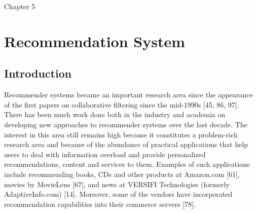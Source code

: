 Chapter 5

\chapter{Recommendation System} %

\label{Chapter5} %



\section{Introduction}
Recommender systems became an important research area since the appearance of the first papers on collaborative filtering since the mid-1990s [45, 86, 97]. There has been much work done both in the industry and academia on developing new approaches to recommender systems over the last decade. The interest in this area still remains high because it constitutes a problem-rich research area and because of the abundance of practical applications that help users to deal with information overload and provide personalized recommendations, content and services to them. Examples of such applications include recommending books, CDs and other products at Amazon.com [61], movies by MovieLens [67], and news at VERSIFI Technologies (formerly AdaptiveInfo.com) [14]. Moreover, some of the vendors have incorporated recommendation capabilities into their commerce servers [78].

